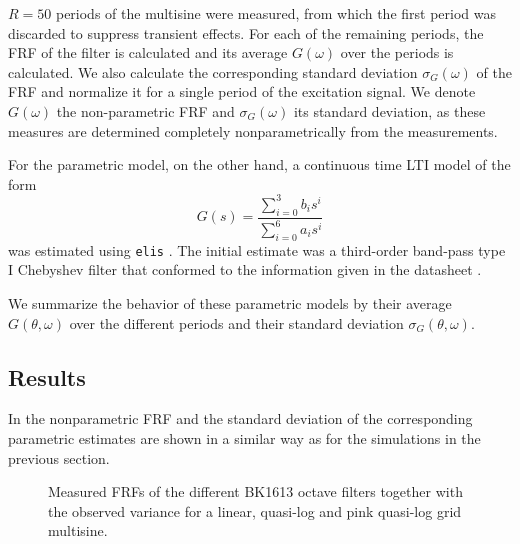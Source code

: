     $R=50$ periods of the multisine were measured, from which the first period was discarded to suppress transient effects.
    For each of the remaining periods, the FRF of the filter is calculated and its average $G\left(\omega \right)$ over the periods is calculated.
    We also calculate the corresponding standard deviation $\sigma_G\left( \omega \right)$ of the FRF and normalize it for a single period of the excitation signal.
    We denote $G\left(\omega \right)$ the non-parametric FRF and $\sigma_G\left( \omega \right)$ its standard deviation, as these measures are determined completely nonparametrically from the measurements.

    For the parametric model, on the other hand, a continuous time LTI model of the form
    \begin{equation}
      G(s) = \frac{\sum_{i=0}^3 b_i s^i}{\sum_{i=0}^6 a_i s^i}
    \end{equation}
    was estimated using \texttt{elis} \citep{FDIDENT}.
    The initial estimate was a third-order band-pass type I Chebyshev filter \citep{Zverev1967} that conformed to the information given in the datasheet \citep{datasheet_bk1613}.

    We summarize the behavior of these parametric models by their average $G\left(\theta,\omega \right)$ over the different periods and their standard deviation $\sigma_G\left(\theta,\omega \right)$.

    \subsection{Results}
    In  the nonparametric FRF and the standard deviation of the corresponding parametric estimates are shown in a similar way as for the simulations in the previous section.

    \begin{figure}%
    \centering
      \setlength\figureheight{5cm}
      \setlength{}
    
    \caption[Measured FRFs of all BK1613 octave filters and their variance for different excitation signals.]{Measured FRFs of the different \bruelkjaer BK1613 octave filters together with the observed variance for a linear, quasi-log and pink quasi-log grid multisine.}%
      \label{fig:measurements}
    \end{figure}

